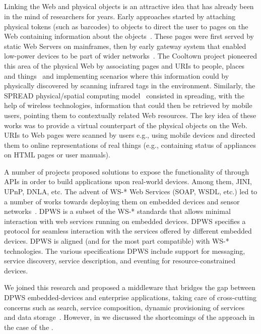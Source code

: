 \subsection{\devLayer{}}
Linking the Web and physical objects is an attractive idea that has already been in the mind of researchers for years. Early approaches started by attaching physical tokens (such as barcodes) to objects to direct the user to pages on the Web containing information about the objects~\cite{Want1999}. These pages were first served by static Web Servers on mainframes, then by early gateway system that enabled low-power devices to be part of wider networks~\cite{Schramm2004}. The Cooltown project pioneered this area of the physical Web by associating pages and URIs to people, places and things~\cite{Kindberg2002} and implementing scenarios where this information could by physically discovered by scanning infrared tags in the environment. Similarly, the SPREAD physical/spatial computing model~\cite{Couderc2003} consisted in spreading, with the help of wireless technologies, information that could then be retrieved by mobile users, pointing them to contextually related Web resources. The key idea of these works was to provide a virtual counterpart of the physical objects on the Web. URIs to Web pages were scanned by users e.g., using mobile devices and directed them to online representations of real things (e.g., containing status of appliances on HTML pages or user manuals).

A number of projects proposed solutions to expose the functionality of \sts{} through APIs in order to build applications upon real-world devices. Among them, JINI, UPnP, DNLA, etc. The advent of WS-* Web Services (SOAP, WSDL, etc.) led to a number of works towards deploying them on embedded devices and sensor networks~\cite{Priyantha2008,DeSouza2008,Marin-Perianu2007}. DPWS is a subset of the WS-* standards that allows minimal interaction with web services running on embedded devices. DPWS specifies a protocol for seamless interaction with the services offered by different embedded devices. DPWS is aligned (and for the most part compatible) with WS-* technologies. The various specifications DPWS include support for messaging, service discovery, service description, and eventing for resource-constrained devices.

We joined this research and proposed a middleware that bridges the gap between DPWS embedded-devices and enterprise applications, taking care of cross-cutting concerns such as search, service composition, dynamic provisioning of services and data storage~\cite{Spiess2009,DeSouza2008}. However, in  we discussed the shortcomings of the approach in the case of the \WoT{}.

